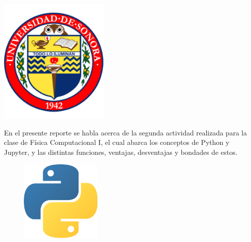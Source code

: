 \documentclass[12pt]{article}
\begin{document}
\begin{titlepage}
\includegraphics[width=0.4\textwidth]{logo.png}\\
 

\vfill %

\end{titlepage}

En el presente reporte se habla acerca de la segunda actividad realizada para la clase de Física Computacional I, el cual abarca los conceptos de Python y Jupyter, y las distintas funciones, ventajas, desventajas y bondades de estos. \\

\begin{figure}
    \centering
    \includegraphics[width=0.35\textwidth]{LogoP.png}
\end{figure}
\end{document}
